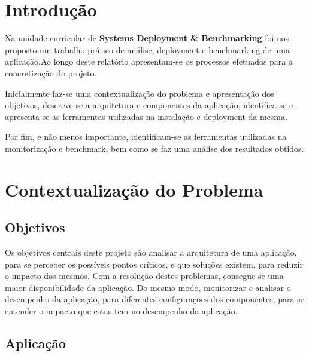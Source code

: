 \chapter{Introdução} \label{chap:intro} %
Na unidade curricular de \textbf{Systems Deployment \& Benchmarking} foi-nos proposto um trabalho prático de análise, deployment e benchmarking de uma aplicação.Ao longo deste relatório apresentam-se os processos efetuados para a concretização do projeto. \newline 

Inicialmente faz-se uma contextualização do problema e apresentação dos objetivos, descreve-se a arquitetura e componentes da aplicação, identifica-se e apresenta-se as ferramentas utilizadas na instalação e deployment da mesma. \newline 

Por fim, e não menos importante, identificam-se as ferramentas utilizadas na monitorização e benchmark, bem como se faz uma análise dos resultados obtidos.

\chapter{Contextualização do Problema}

\section{Objetivos}
Os objetivos centrais deste projeto são analisar a arquitetura de uma aplicação, para se perceber os possíveis pontos críticos, e que soluções existem, para reduzir o impacto dos mesmos. Com a resolução destes problemas, consegue-se uma maior disponibilidade da aplicação. Do mesmo modo, monitorizar e analisar o desempenho da aplicação, para diferentes configurações dos componentes, para se entender o impacto que estas tem no desempenho da aplicação.

\section{Aplicação}

